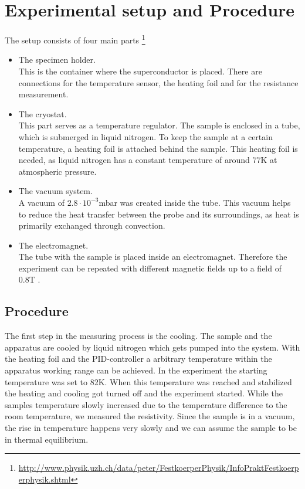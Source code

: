 \documentclass[a4paper,parskip,11pt, DIV12]{scrreprt}
\begin{document}
\chapter{Experimental setup and Procedure}

The setup consists of four main parts \footnote{\url{http://www.physik.uzh.ch/data/peter/FestkoerperPhysik/InfoPraktFestkoerperphysik.shtml}}\\
\begin{itemize}
\item The specimen holder.\\
This is the container where the superconductor is placed. There are connections for the temperature sensor, the heating foil and for the resistance measurement.\\
\item The cryostat.\\
This part serves as a temperature regulator. The sample is enclosed in a tube, which is submerged in liquid nitrogen. To keep the sample at a certain temperature, a heating foil is attached behind the sample. This heating foil is needed, as liquid nitrogen has a constant temperature of around 77K at atmospheric pressure. \\
\item The vacuum system.\\
A vacuum of $2.8 \cdot 10^{-3}$mbar was created inside the tube. This vacuum helps to reduce the heat transfer between the probe and its surroundings, as heat is primarily exchanged through convection.\\ 
\item The electromagnet.\\
The tube with the sample is placed inside an electromagnet. Therefore the experiment can be repeated with different magnetic fields up to a field of 0.8T . 

\end{itemize}

\section*{Procedure}

The first step in the measuring process is the cooling. The sample and the apparatus are cooled by liquid nitrogen which gets pumped into the system. With the heating foil and the PID-controller a arbitrary temperature within the apparatus working range can be achieved. In the experiment the starting temperature was set to 82K. When this temperature was reached and stabilized the heating and cooling got turned off and the experiment started. While the samples temperature slowly increased due to the temperature difference to the room temperature, we measured the resistivity. 
Since the sample is in a vacuum, the rise in temperature happens very slowly and we can assume the sample to be in thermal equilibrium. 
\end{document}
